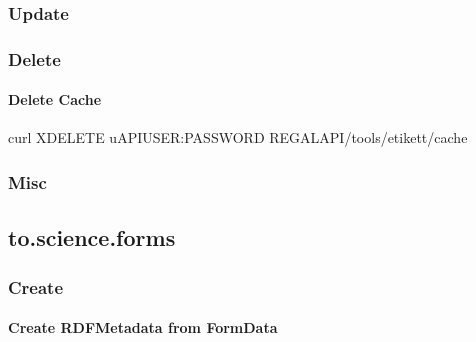 \documentclass[letterpaper,10pt,english]{sphinxmanual}
\begin{document}
\subsubsection{Update}
\label{\detokenize{api-labels:update}}\label{\detokenize{api-labels:update-2}}

\subsubsection{Delete}
\label{\detokenize{api-labels:delete}}\label{\detokenize{api-labels:delete-2}}

\paragraph{Delete Cache}
\label{\detokenize{api-labels:delete-cache}}\label{\detokenize{api-labels:id4}}
\begin{sphinxVerbatim}[commandchars=\\\{\}]
curl \PYGZhy{}XDELETE \PYGZhy{}u\PYGZdl{}API\PYGZus{}USER:\PYGZdl{}PASSWORD \PYGZdl{}REGAL\PYGZus{}API/tools/etikett/cache
\end{sphinxVerbatim}


\subsubsection{Misc}
\label{\detokenize{api-labels:misc}}\label{\detokenize{api-labels:misc-2}}

\subsection{to.science.forms}
\label{\detokenize{api-forms:to-science-forms}}\label{\detokenize{api-forms:id1}}\label{\detokenize{api-forms::doc}}
\sphinxAtStartPar
{}


\subsubsection{Create}
\label{\detokenize{api-forms:create}}\label{\detokenize{api-forms:forms-create}}

\paragraph{Create RDF\sphinxhyphen{}Metadata from Form\sphinxhyphen{}Data}
\label{\detokenize{api-forms:create-rdf-metadata-from-form-data}}\label{\detokenize{api-forms:id2}}
\end{document}
